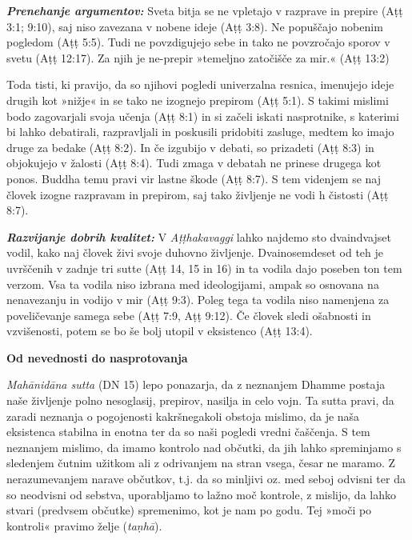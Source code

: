 \textbf{\emph{Prenehanje argumentov:} }Sveta bitja se ne vpletajo v
razprave in prepire (Aṭṭ 3:1; 9:10), saj niso zavezana v nobene ideje
(Aṭṭ 3:8). Ne popuščajo nobenim pogledom (Aṭṭ 5:5). Tudi ne povzdigujejo
sebe in tako ne povzročajo sporov v svetu (Aṭṭ 12:17). Za njih je
ne-prepir »temeljno zatočišče za mir.« (Aṭṭ 13:2)

Toda tisti, ki pravijo, da so njihovi pogledi univerzalna resnica,
imenujejo ideje drugih kot »nižje« in se tako ne izognejo prepirom (Aṭṭ
5:1). S takimi mislimi bodo zagovarjali svoja učenja (Aṭṭ 8:1) in si
začeli iskati nasprotnike, s katerimi bi lahko debatirali, razpravljali
in poskusili pridobiti zasluge, medtem ko imajo druge za bedake (Aṭṭ
8:2). In če izgubijo v debati, so prizadeti (Aṭṭ 8:3) in objokujejo v
žalosti (Aṭṭ 8:4). Tudi zmaga v debatah ne prinese drugega kot ponos.
Buddha temu pravi vir lastne škode (Aṭṭ 8:7). S tem videnjem se naj
človek izogne razpravam in prepirom, saj tako življenje ne vodi h
čistosti (Aṭṭ 8:7).

\textbf{\emph{Razvijanje dobrih kvalitet:}} V \emph{Aṭṭhakavaggi} lahko
najdemo sto dvaindvajset vodil, kako naj človek živi svoje duhovno
življenje. Dvainosemdeset od teh je uvrščenih v zadnje tri sutte (Aṭṭ
14, 15 in 16) in ta vodila dajo poseben ton tem verzom. Vsa ta vodila
niso izbrana med ideologijami, ampak so osnovana na nenavezanju in
vodijo v mir (Aṭṭ 9:3). Poleg tega ta vodila niso namenjena za
poveličevanje samega sebe (Aṭṭ 7:9, Aṭṭ 9:12). Če človek sledi ošabnosti
in vzvišenosti, potem se bo še bolj utopil v eksistenco (Aṭṭ 13:4).

\textbf{Od nevednosti do nasprotovanja}

\emph{Mahānidāna sutta} (DN 15) lepo ponazarja, da z neznanjem Dhamme
postaja naše življenje polno nesoglasij, prepirov, nasilja in celo vojn.
Ta sutta pravi, da zaradi neznanja o pogojenosti kakršnegakoli obstoja
mislimo, da je naša eksistenca stabilna in enotna ter da so naši pogledi
vredni čaščenja. S tem neznanjem mislimo, da imamo kontrolo nad občutki,
da jih lahko spreminjamo s sledenjem čutnim užitkom ali z odrivanjem na
stran vsega, česar ne maramo. Z nerazumevanjem narave občutkov, t.j. da
so minljivi oz. med seboj odvisni ter da so neodvisni od sebstva,
uporabljamo to lažno moč kontrole, z mislijo, da lahko stvari (predvsem
občutke) spremenimo, kot je nam po godu. Tej »moči po kontroli« pravimo
želje (\emph{taṇhā}).

